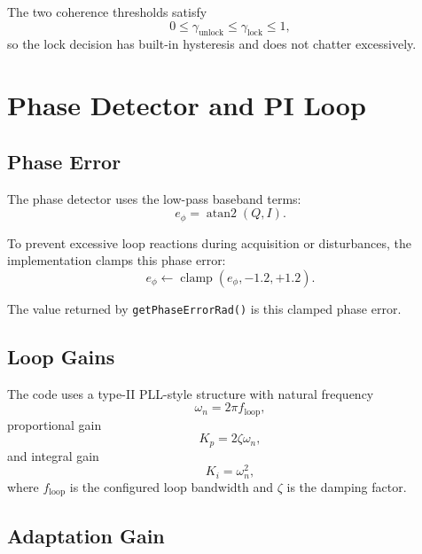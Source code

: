 \documentclass[conference]{IEEEtran}
\begin{document}
The two coherence thresholds satisfy
\begin{equation}
  0 \le \gamma_{\mathrm{unlock}} \le \gamma_{\mathrm{lock}} \le 1,
\end{equation}
so the lock decision has built-in hysteresis and does not chatter excessively.

\section{Phase Detector and PI Loop}\label{sec:loop}

\subsection{Phase Error}

The phase detector uses the low-pass baseband terms:
\begin{equation}
  e_\phi = \operatorname{atan2}(Q, I).
\end{equation}

To prevent excessive loop reactions during acquisition or disturbances, the
implementation clamps this phase error:
\begin{equation}
  e_\phi \leftarrow \operatorname{clamp}(e_\phi,-1.2,+1.2).
\end{equation}

The value returned by \texttt{getPhaseErrorRad()} is this clamped phase error.

\subsection{Loop Gains}

The code uses a type-II PLL-style structure with natural frequency
\begin{equation}
  \omega_n = 2\pi f_{\mathrm{loop}},
\end{equation}
proportional gain
\begin{equation}
  K_p = 2\zeta \omega_n,
\end{equation}
and integral gain
\begin{equation}
  K_i = \omega_n^2,
\end{equation}
where \(f_{\mathrm{loop}}\) is the configured loop bandwidth and \(\zeta\) is
the damping factor.

\subsection{Adaptation Gain}
\end{document}
